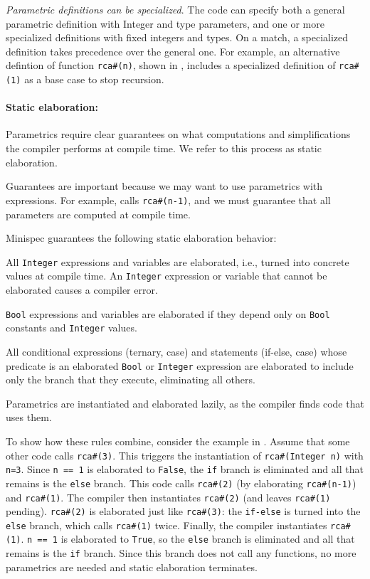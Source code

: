 \emph{Parametric definitions can be specialized}.
The code can specify both a general parametric definition with Integer and type parameters,
and one or more specialized definitions with fixed integers and types.
On a match, a specialized definition takes precedence over the general one.
For example, an alternative defintion of function \texttt{rca\#(n)}, shown in ,
includes a specialized definition of \texttt{rca\#(1)} as a base case to stop recursion.

\paragraph{Static elaboration:} Parametrics require clear guarantees on what computations
and simplifications the compiler performs at compile time.
We refer to this process as static elaboration.

Guarantees are important because we may want to use parametrics with expressions.
For example,  calls \texttt{rca\#(n-1)},
and we must guarantee that all parameters are computed at compile time.

Minispec guarantees the following static elaboration behavior:
\begin{compactenum}
\item All \texttt{Integer} expressions and variables are elaborated, i.e., turned into concrete values at compile time.
  An \texttt{Integer} expression or variable that cannot be elaborated causes a compiler error.
\item \texttt{Bool} expressions and variables are elaborated if they depend only on \texttt{Bool} constants and \texttt{Integer} values.
\item All conditional expressions (ternary, case) and statements (if-else, case)
  whose predicate is an elaborated \texttt{Bool} or \texttt{Integer} expression are
  elaborated to include only the branch that they execute, eliminating all others.
\item Parametrics are instantiated and elaborated lazily, as the compiler finds code that uses them.
\end{compactenum}

To show how these rules combine, consider the example in
.
Assume that some other code calls \verb|rca#(3)|.
This triggers the instantiation of \verb|rca#(Integer n)| with \verb|n=3|.
Since \verb|n == 1| is elaborated to \verb|False|, the \verb|if| branch is eliminated and all that remains is
the \verb|else| branch.
This code calls \verb|rca#(2)| (by elaborating \verb|rca#(n-1)|) and \verb|rca#(1)|.
The compiler then instantiates \verb|rca#(2)| (and leaves \verb|rca#(1)| pending).
\verb|rca#(2)| is elaborated just like \verb|rca#(3)|: the \verb|if-else| is turned into the \verb|else| branch,
which calls \verb|rca#(1)| twice.
Finally, the compiler instantiates \verb|rca#(1)|.
\verb|n == 1| is elaborated to \verb|True|, so the \verb|else| branch is eliminated and all that remains is the
\verb|if| branch. Since this branch does not call any functions,
no more parametrics are needed and static elaboration terminates.

